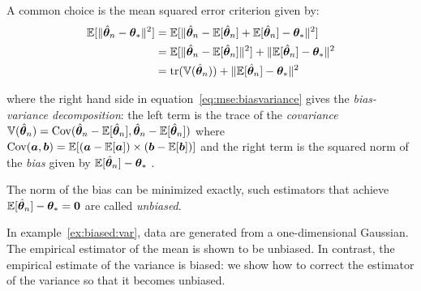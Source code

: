 A common choice is the mean squared error criterion given by:
\begin{align}
  \mathbb{E}[\|\hat{\boldsymbol{\theta}}_n - \boldsymbol{\theta}_*\|^2] &= \mathbb{E}[\|\hat{\boldsymbol{\theta}}_n - \mathbb{E}[\hat{\boldsymbol{\theta}}_n] + \mathbb{E}[\hat{\boldsymbol{\theta}}_n] - \boldsymbol{\theta}_*\|^2] \\
                                   &= \mathbb{E}[\|\hat{\boldsymbol{\theta}}_n - \mathbb{E}[\hat{\boldsymbol{\theta}}_n]\|^2] + \|\mathbb{E}[\hat{\boldsymbol{\theta}}_n] - \boldsymbol{\theta}_*\|^2  \\
                                         &= \mathop{\mathrm{tr}}(\mathbb{V}(\hat{\boldsymbol{\theta}}_n)) + \|\mathbb{E}[\hat{\boldsymbol{\theta}}_n] - \boldsymbol{\theta}_*\|^2 \label{eq:mse:biasvariance}
\end{align}

where the right hand side in equation~\ref{eq:mse:biasvariance} gives the
\emph{bias-variance decomposition}: the left term is the trace of the \emph{covariance} $\mathbb{V}(\hat{\boldsymbol{\theta}}_n) = \operatorname*{Cov}(\hat{\boldsymbol{\theta}}_n -
\mathbb{E}[\hat{\boldsymbol{\theta}}_n], \hat{\boldsymbol{\theta}}_n -
\mathbb{E}[\hat{\boldsymbol{\theta}}_n])$ where $\operatorname*{Cov}(\boldsymbol{a}, \boldsymbol{b}) = \mathbb{E}[(\boldsymbol{a} - \mathbb{E}[\boldsymbol{a}]) \times (\boldsymbol{b} -
\mathbb{E}[\boldsymbol{b}])]$ and the right term is the squared norm of the \emph{bias} given by $\mathbb{E}[\hat{\boldsymbol{\theta}}_n] - \boldsymbol{\theta}_*$ .

The norm of the bias can be minimized exactly, such estimators that achieve $\mathbb{E}[\hat{\boldsymbol{\theta}}_n] - \boldsymbol{\theta}_* = \boldsymbol{0}$ are called \emph{unbiased}.

In example~\ref{ex:biased:var}, data are generated from a one-dimensional
Gaussian. The empirical estimator of the mean is shown to be unbiased. In
contrast, the empirical estimate of the variance is biased: we show how to
correct the estimator of the variance so that it becomes unbiased.

